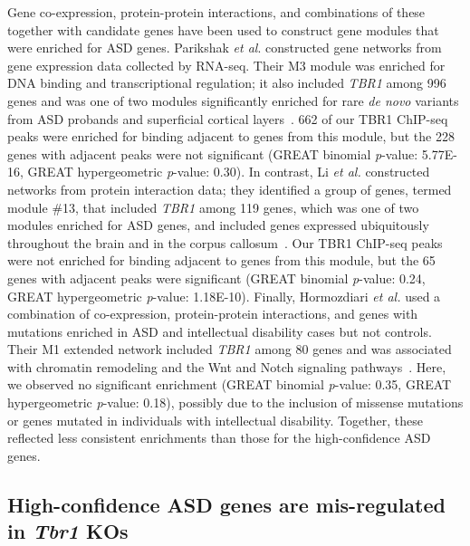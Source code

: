 Gene co-expression, protein-protein interactions, and combinations of
these together with candidate genes have been used to construct gene
modules that were enriched for ASD genes. Parikshak \emph{et al}.
constructed gene networks from gene expression data collected by
RNA-seq. Their M3 module was enriched for DNA binding and
transcriptional regulation; it also included \emph{TBR1} among 996 genes
and was one of two modules significantly enriched for rare \emph{de
novo} variants from ASD probands and superficial cortical layers~\citep{Parikshak:2013di}. 662 of our TBR1 ChIP-seq peaks were enriched
for binding adjacent to genes from this module, but the 228 genes with
adjacent peaks were not significant (GREAT binomial \emph{p}-value:
5.77E-16, GREAT hypergeometric \emph{p}-value: 0.30). In contrast, Li
\emph{et al.} constructed networks from protein interaction data; they
identified a group of genes, termed module \#13, that included
\emph{TBR1} among 119 genes, which was one of two modules enriched for
ASD genes, and included genes expressed ubiquitously throughout the
brain and in the corpus callosum~\citep{Li:2014ft}. Our TBR1 ChIP-seq
peaks were not enriched for binding adjacent to genes from this module,
but the 65 genes with adjacent peaks were significant (GREAT binomial
\emph{p}-value: 0.24, GREAT hypergeometric \emph{p}-value: 1.18E-10).
Finally, Hormozdiari \emph{et al.} used a combination of co-expression,
protein-protein interactions, and genes with mutations enriched in ASD
and intellectual disability cases but not controls. Their M1 extended
network included \emph{TBR1} among 80 genes and was associated with
chromatin remodeling and the Wnt and Notch signaling pathways~\citep{Hormozdiari:2015ih}. Here, we observed no significant enrichment
(GREAT binomial \emph{p}-value: 0.35, GREAT hypergeometric
\emph{p}-value: 0.18), possibly due to the inclusion of missense
mutations or genes mutated in individuals with intellectual disability.
Together, these reflected less consistent enrichments than those for the
high-confidence ASD genes.

\subsection{High-confidence ASD genes are mis-regulated in \emph{Tbr1} KOs }

